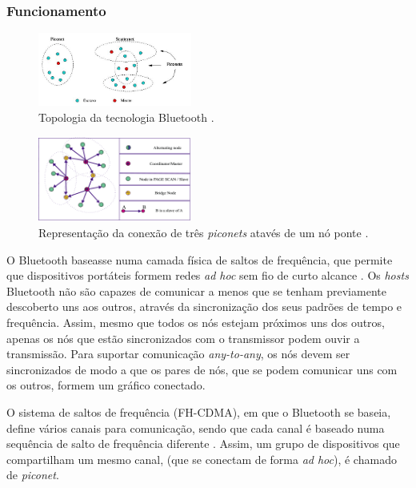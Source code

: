 \documentclass[conference]{IEEEtran}
\begin{document}
\subsubsection{Funcionamento}

\begin{figure}[!t]
  \centering
  \includegraphics[width=0.45\textwidth]{Esquema_Bluetooth.png}
  \caption{Topologia da tecnologia Bluetooth \cite{blueesptec}.}
  \label{fig:topBluet}
\end{figure}

\begin{figure}[!t]
  \centering
  \includegraphics[width=0.45\textwidth]{no_ponte.png}
  \caption{Representação da conexão de três \textit{piconets} atavés de um nó ponte \cite{salonidis2005distributed}.}
  \label{fig:noPonte}
\end{figure}

O Bluetooth baseasse numa camada física de saltos de frequência, que permite que dispositivos portáteis formem redes \textit{ad hoc} sem fio de curto alcance \cite{salonidis2005distributed}. 
Os \textit{hosts} Bluetooth não são capazes de comunicar a menos que se tenham previamente descoberto uns aos outros, através da sincronização dos seus padrões de tempo e frequência. 
Assim, mesmo que todos os nós estejam próximos uns dos outros, apenas os nós que estão sincronizados com o transmissor podem ouvir a transmissão.
Para suportar comunicação \textit{any-to-any}, os nós devem ser sincronizados de modo a que os pares de nós, que se podem comunicar uns com os outros, formem um gráfico conectado.

O sistema de saltos de frequência (FH-CDMA), em que o Bluetooth se baseia, define vários canais para comunicação, sendo que cada canal é baseado numa sequência de salto de frequência diferente \cite{salonidis2005distributed}. 
Assim, um grupo de dispositivos que compartilham um mesmo canal, (que se conectam de forma \textit{ad hoc}), é chamado de \textit{piconet}. 
\end{document}
